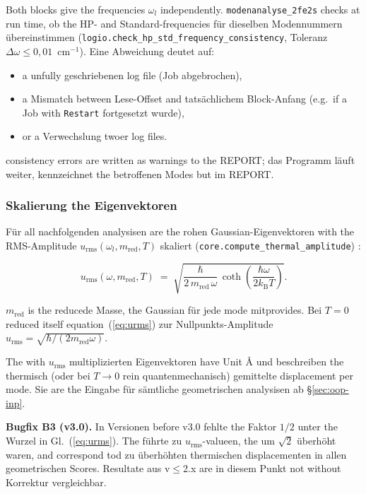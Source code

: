 \documentclass[11pt,a4paper,twoside]{article}
\newcommand{\kB}{k_{\mathrm{B}}}
\newcommand{\urms}{u_{\mathrm{rms}}}
\theoremstyle{remark}
\begin{document}
Both blocks give the frequencies $\omega_l$ independently.
\texttt{modenanalyse\_2fe2s} checks at run time, ob the HP- and
Standard-frequencies f\"ur dieselben Modennummern \"ubereinstimmen
(\texttt{logio.check\_hp\_std\_frequency\_consistency}, Toleranz
$\Delta\omega \leq 0{,}01$~cm$^{-1}$). Eine Abweichung deutet auf:

\begin{itemize}
  \item a unfully geschriebenen log file (Job abgebrochen),
  \item a Mismatch between Lese-Offset and tats\"achlichem
        Block-Anfang (e.g.\ if a Job with \texttt{Restart} fortgesetzt
        wurde),
  \item or a Verwechslung twoer log files.
\end{itemize}

consistency errors are written as warnings to the REPORT; das
Programm l\"auft weiter, kennzeichnet the betroffenen Modes but im
REPORT.

\subsubsection*{Skalierung the Eigenvektoren}

F\"ur all nachfolgenden analysisen are the rohen
Gaussian-Eigenvektoren with the RMS-Amplitude
$\urms(\omega_l, m_{\mathrm{red}}, T)$ skaliert
(\texttt{core.compute\_thermal\_amplitude})
\cite{Achterhold2002,WilsonDeciusCross1955}:

\begin{equation}
  \urms(\omega, m_{\mathrm{red}}, T) \;=\;
  \sqrt{\frac{\hbar}{2\,m_{\mathrm{red}}\,\omega} \,
        \coth\!\left(\frac{\hbar\omega}{2\kB T}\right)} .
  \label{eq:urms}
\end{equation}

$m_{\mathrm{red}}$ is the reducede Masse, the Gaussian f\"ur jede
mode mitprovides. Bei $T=0$ reduced itself equation~(\ref{eq:urms}) zur
Nullpunkts-Amplitude
$\urms = \sqrt{\hbar / (2 m_{\mathrm{red}} \omega)}$.

The with $\urms$ multiplizierten Eigenvektoren have Unit \AA{} und
beschreiben the thermisch (oder bei $T \to 0$ rein quantenmechanisch)
gemittelte displacement per mode. Sie are the Eingabe f\"ur s\"amtliche
geometrischen analysisen ab \S\ref{sec:oop-inp}.

\begin{warnbox}
\textbf{Bugfix B3 (v3.0).} In Versionen before v3.0 fehlte the Faktor
$1/2$ unter the Wurzel in Gl.~(\ref{eq:urms}). The f\"uhrte zu
$\urms$-valueen, the um $\sqrt{2}$ \"uberh\"oht waren, and correspond tod
zu \"uberh\"ohten thermischen displacementen in allen
geometrischen Scores. Resultate aus v$\leq$2.x are in diesem
Punkt not without Korrektur vergleichbar.
\end{warnbox}
\end{document}
